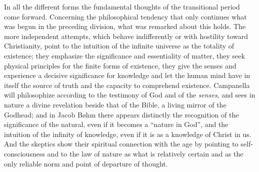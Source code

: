 In all the different forms the fundamental thoughts of the transitional
period come forward. Concerning the philosophical tendency that only
continues what was begun in the preceding division, what was remarked about this holds.
The more independent attempts, which behave indifferently or with
hostility toward Christianity, point to the intuition of the infinite
universe as the totality of existence; they emphasize the significance
and essentiality of matter, they seek physical principles for the finite
forms of existence, they give the senses and experience a decisive
significance for knowledge and let the human mind have in itself the
source of truth and the capacity to comprehend existence. Campanella will
philosophize according to the testimony of God and of the
\emph{senses}, and sees in nature a divine revelation beside that of the
Bible, a living mirror of the Godhead; and in Jacob Bøhm there appears
distinctly the recognition of the significance of the natural, even if it
becomes a ``nature in God'', and the intuition of the infinity of
knowledge, even if it is as a knowledge of Christ in us. And the skeptics
show their spiritual connection with the age by pointing to
self-consciousness and to the law of nature as what is relatively certain
and as the only reliable norm and point of departure of thought.

